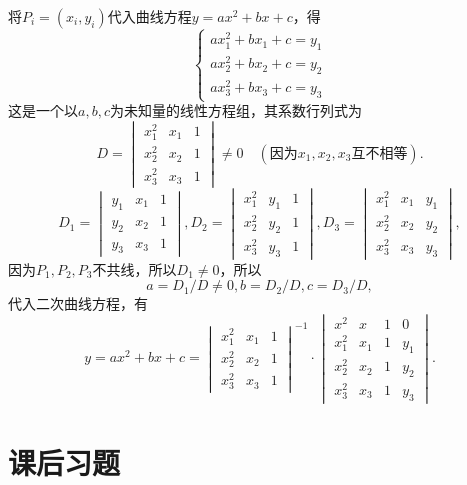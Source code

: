 \begin{solution}
将$P_i = (x_i ,y_i)$代入曲线方程$y = ax^2+bx+c$，得
$$\begin{cases}
ax_1^2 + bx_1 + c = y_1 \\
ax_2^2 + bx_2 + c = y_2 \\
ax_3^2 + bx_3 + c = y_3
\end{cases}$$
这是一个以$a, b, c$为未知量的线性方程组，其系数行列式为
$$D = \begin{vmatrix} x_1^2 & x_1 & 1 \\ x_2^2 & x_2 & 1 \\ x_3^2 & x_3 & 1 \end{vmatrix} \neq 0 \quad(\text{因为$x_1, x_2, x_3$互不相等}).$$
$$D_1 = \begin{vmatrix} y_1 & x_1 & 1 \\ y_2 & x_2 & 1 \\ y_3 & x_3 & 1 \end{vmatrix},
D_2 = \begin{vmatrix} x_1^2 & y_1 & 1 \\ x_2^2 & y_2 & 1 \\ x_3^2 & y_3 & 1 \end{vmatrix},
D_3 = \begin{vmatrix} x_1^2 & x_1 & y_1 \\ x_2^2 & x_2 & y_2 \\ x_3^2 & x_3 & y_3 \end{vmatrix},$$
因为$P_1, P_2, P_3$不共线，所以$D_1\neq 0$，所以
$$a = D_1/D\neq 0, b = D_2/D, c = D_3/D,$$
代入二次曲线方程，有
$$y = ax^2+bx+c = \begin{vmatrix} x_1^2 & x_1 & 1 \\ x_2^2 & x_2 & 1 \\ x_3^2 & x_3 & 1 \end{vmatrix}^{-1}\cdot\begin{vmatrix} x^2 & x & 1 & 0 \\ x_1^2 & x_1 & 1 & y_1 \\ x_2^2 & x_2 & 1 & y_2 \\ x_3^2 & x_3 & 1 & y_3 \end{vmatrix}.$$
\end{solution}


\section{课后习题}

